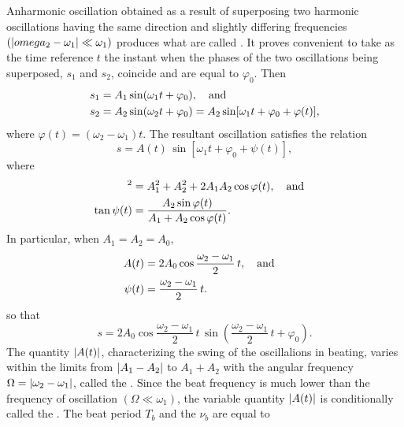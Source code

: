 \subsection{}\label{28.4.5} Anharmonic oscillation obtained as a result of superposing two harmonic oscillations having the same direction and slightly differing frequencies $(\abs{omega_{2} - \omega_{1}} \ll \omega_{1})$ produces what are called . It proves convenient to take as the time reference $t$ the instant when the phases of the two oscillations being superposed, $s_{1}$ and $s_{2}$, coincide and are equal to $\varphi_{0}$. Then 
\begin{align*}%
s_{1} & = A_{1} \sin(\omega_{1}t + \varphi_{0}), \qand \\ 
s_{2} & =  A_{2}\sin (\omega_{2}t + \varphi_{0}) = A_{2} \sin [ \omega_{1}t + \varphi_{0} + \varphi(t)],
\end{align*}
where $\varphi(t)= (\omega_{2} - \omega_{1})t$. The resultant oscillation satisfies the relation
\begin{equation*}%
s = A (t)\, \sin [ \omega_{1}t + \varphi_{0} + \psi(t)],
\end{equation*}
where
\begin{align*}%
[A(t)]^{2} & = A_{1}^{2}+ A_{2}^{2} + 2A_{1}A_{2}\cos \varphi(t), \qand \\
\tan \psi (t) & = \frac{A_{2} \sin \varphi(t)}{A_{1}+A_{2} \cos \varphi(t)}.
\end{align*}
In particular, when $A_{1} = A_{2} = A_{0}$,
\begin{align*}%
A(t) & = 2 A_{0}\cos \frac{\omega_{2} - \omega_{1}}{2}\, t, \qand \\
\psi (t) & =\frac{\omega_{2} - \omega_{1}}{2}\, t.
\end{align*}
so that
\begin{equation*}%
s = 2A_{0}\cos  \frac{\omega_{2} - \omega_{1}}{2}\, t \, \sin \left( \frac{\omega_{2} - \omega_{1}}{2}\, t + \varphi_{0}\right).
\end{equation*}
The quantity $\abs{A (t)}$, characterizing the swing of the oscillalions in beating, varies within the limits from $\abs{A_{1} - A_{2}}$ to $A_{1} + A_{2}$ with the angular frequency $\Omega = \abs{\omega_{2} - \omega_{1}}$, called the . Since the beat frequency is much lower than the frequency of oscillation $(\Omega \ll \omega_{1})$, the variable quantity $\abs{A (t)}$ is conditionally called the . The beat period $T_{b}$ and the  $\nu_{b}$ are equal to
